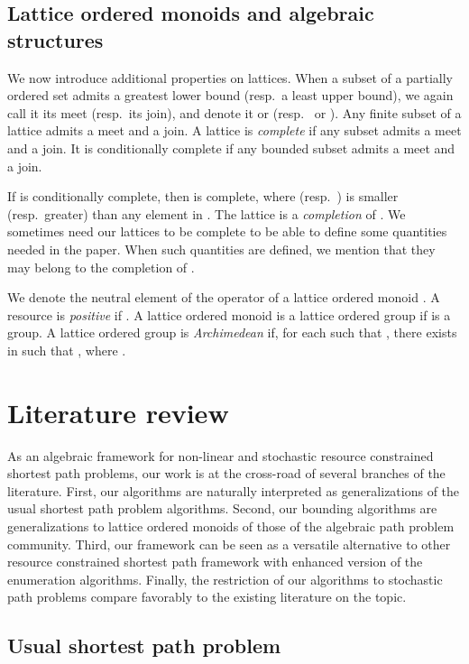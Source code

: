 \documentclass[11pt]{amsart}
\theoremstyle{plain}
\theoremstyle{remark}
\begin{document}
\subsection{Lattice ordered monoids and algebraic structures} \label{sub:lattice_ordered_monoids_and_algebraic_structures}

We now introduce additional properties on lattices. When a subset  of a partially ordered set admits a greatest lower bound (resp.~a least upper bound), we again call it its meet (resp.~its join), and denote it  or  (resp.~ or ). Any finite subset of a lattice admits a meet and a join. A lattice is \emph{complete} if any subset  admits a meet and a join. It is conditionally complete if any bounded subset  admits a meet and a join. 


If  is conditionally complete, then  is complete, where  (resp.~) is smaller (resp.~greater) than any element in . The lattice  is a \emph{completion} of . 
We sometimes need our lattices to be complete to be able to define some quantities needed in the paper. When such quantities are defined, we mention that they may belong to the completion  of .

We denote  the neutral element of the operator  of a lattice ordered monoid . A resource  is \emph{positive} if . A lattice ordered monoid  is a lattice ordered group if  is a group. A lattice ordered group is \emph{Archimedean} if, for each  such that , there exists  in  such that , where .


\section{Literature review} \label{sec:literature_review}

As an algebraic framework for non-linear and stochastic resource constrained shortest path problems, our work is at the cross-road of several branches of the literature. First, our algorithms are naturally interpreted as generalizations of the usual shortest path problem algorithms. Second, our bounding algorithms are generalizations to lattice ordered monoids of those of the algebraic path problem community. Third, our framework can be seen as a versatile alternative to other resource constrained shortest path framework with enhanced version of the enumeration algorithms. Finally, the restriction of our algorithms to stochastic path problems compare favorably to the existing literature on the topic.

\subsection{Usual shortest path problem} \label{sub:usual_shortest_path_problem}
\end{document}
